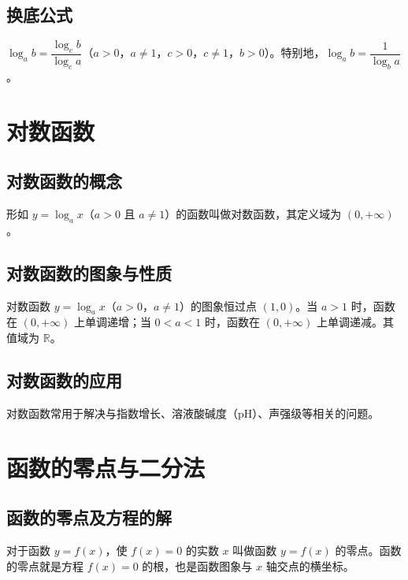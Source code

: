 \documentclass[lang=cn,newtx,10pt,scheme=chinese,nofont]{elegantbook}
\begin{document}
\subsection{换底公式}
\begin{definition}[换底公式]
$\log_a b=\dfrac{\log_c b}{\log_c a}$（$a>0$，$a \neq 1$，$c>0$，$c \neq 1$，$b>0$）。特别地，$\log_a b=\dfrac{1}{\log_b a}$。
\end{definition}

\section{对数函数}
\subsection{对数函数的概念}
\begin{definition}[对数函数]
形如 $y=\log_a x$（$a>0$ 且 $a \neq 1$）的函数叫做对数函数，其定义域为 $(0,+\infty)$。
\end{definition}
\subsection{对数函数的图象与性质}
\begin{definition}[对数函数的性质]
对数函数 $y=\log_a x$（$a>0$，$a \neq 1$）的图象恒过点 $(1,0)$。当 $a>1$ 时，函数在 $(0,+\infty)$ 上单调递增；当 $0<a<1$ 时，函数在 $(0,+\infty)$ 上单调递减。其值域为 $\mathbb{R}$。
\end{definition}
\subsection{对数函数的应用}
\begin{definition}[对数函数的应用]
对数函数常用于解决与指数增长、溶液酸碱度（$\mathrm{pH}$）、声强级等相关的问题。
\end{definition}

\section{函数的零点与二分法}
\subsection{函数的零点及方程的解}
\begin{definition}[函数的零点]
对于函数 $y=f(x)$，使 $f(x)=0$ 的实数 $x$ 叫做函数 $y=f(x)$ 的零点。函数的零点就是方程 $f(x)=0$ 的根，也是函数图象与 $x$ 轴交点的横坐标。
\end{definition}
\end{document}
